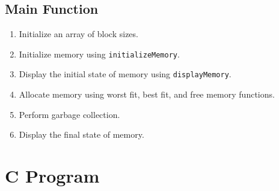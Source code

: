 {  \subsection{Main Function}
  \begin{enumerate}[label=\arabic*.,left=0pt]
    \item Initialize an array of block sizes.
    \item Initialize memory using \texttt{initializeMemory}.
    \item Display the initial state of memory using \texttt{displayMemory}.
    \item Allocate memory using worst fit, best fit, and free memory functions.
    \item Perform garbage collection.
    \item Display the final state of memory.
  \end{enumerate}
 }
\section{C Program}

